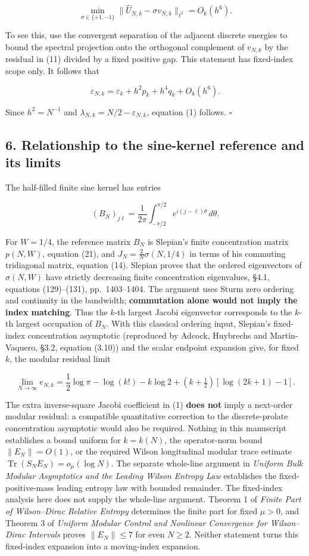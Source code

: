 \documentclass[
  10pt,
  a4paper,
]{article}
\begin{document}
\[
\min_{\sigma\in\{+1,-1\}}\|\widehat U_{N,k}-\sigma v_{N,k}\|_{\ell^2}=O_k(h^6).
\]

To see this, use the convergent separation of the adjacent discrete energies to bound the spectral projection onto the orthogonal complement of \(v_{N,k}\) by the residual in (11) divided by a fixed positive gap. This statement has fixed-index scope only. It follows that

\[
\varepsilon_{N,k}=\varepsilon_k+h^2p_k+h^4q_k+O_k(h^6).
\]

Since \(h^2=N^{-1}\) and \(\lambda_{N,k}=N/2-\varepsilon_{N,k}\), equation (1) follows. \(\square\)

\subsection{6. Relationship to the sine-kernel reference and its limits}\label{relationship-to-the-sine-kernel-reference-and-its-limits}

The half-filled finite sine kernel has entries

\[
(B_N)_{j\ell}=\frac1{2\pi}\int_{-\pi/2}^{\pi/2}e^{i(j-\ell)\theta}\,d\theta.
\]

For \(W=1/4\), the reference matrix \(B_N\) is Slepian's finite concentration matrix \(p(N,W)\), equation (21), and \(J_N=\frac{2}{N}\sigma(N,1/4)\) in terms of his commuting tridiagonal matrix, equation (14). Slepian proves that the ordered eigenvectors of \(\sigma(N,W)\) have strictly decreasing finite concentration eigenvalues, §4.1, equations (129)--(131), pp.~1403--1404. The argument uses Sturm zero ordering and continuity in the bandwidth; \textbf{commutation alone would not imply the index matching}. Thus the \(k\)-th largest Jacobi eigenvector corresponds to the \(k\)-th largest occupation of \(B_N\). With this classical ordering input, Slepian's fixed-index concentration asymptotic (reproduced by Adcock, Huybrechs and Martín-Vaquero, §3.2, equation (3.10)) and the scalar endpoint expansion give, for fixed \(k\), the modular residual limit

\[
\lim_{N\to\infty}e_{N,k}=\frac12\log\pi-\log(k!)-k\log2
+\left(k+\tfrac12\right)[\log(2k+1)-1].
\]

The extra inverse-square Jacobi coefficient in (1) \textbf{does not} imply a next-order modular residual: a compatible quantitative correction to the discrete-prolate concentration asymptotic would also be required. Nothing in this manuscript establishes a bound uniform for \(k=k(N)\), the operator-norm bound \(\|E_N\|=O(1)\), or the required Wilson longitudinal modular trace estimate \(\operatorname{Tr}(S_NE_N)=o_\mu(\log N)\). The separate whole-line argument in \emph{Uniform Bulk Modular Asymptotics and the Leading Wilson Entropy Law} establishes the fixed-positive-mass leading entropy law with bounded remainder. The fixed-index analysis here does not supply the whole-line argument. Theorem 1 of \emph{Finite Part of Wilson--Dirac Relative Entropy} determines the finite part for fixed \(\mu>0\), and Theorem 3 of \emph{Uniform Modular Control and Nonlinear Convergence for Wilson--Dirac Intervals} proves \(\|E_N\|\le7\) for even \(N\ge2\). Neither statement turns this fixed-index expansion into a moving-index expansion.
\end{document}

